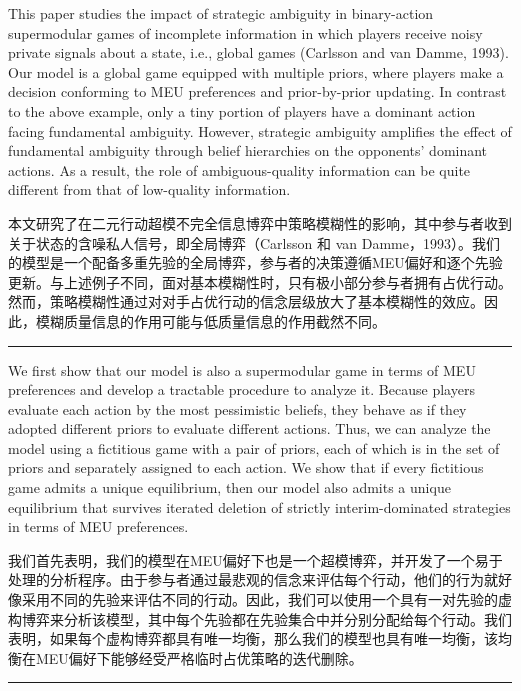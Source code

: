 \documentclass[12pt,a4paper]{article}
\newenvironment{original}
  {\par\medskip\noindent\color{black}\ignorespaces}
  {\par\medskip}
\newenvironment{translation}
  {\par\noindent\color{darkblue}\ignorespaces}
  {\par\medskip\noindent\hrule\par\medskip}
\theoremstyle{definition}
\theoremstyle{remark}
\begin{document}
\begin{original}
This paper studies the impact of strategic ambiguity in binary-action supermodular games of incomplete information in which players receive noisy private signals about a state, i.e., global games (Carlsson and van Damme, 1993). Our model is a global game equipped with multiple priors, where players make a decision conforming to MEU preferences and prior-by-prior updating. In contrast to the above example, only a tiny portion of players have a dominant action facing fundamental ambiguity. However, strategic ambiguity amplifies the effect of fundamental ambiguity through belief hierarchies on the opponents' dominant actions. As a result, the role of ambiguous-quality information can be quite different from that of low-quality information.
\end{original}
\begin{translation}
本文研究了在二元行动超模不完全信息博弈中策略模糊性的影响，其中参与者收到关于状态的含噪私人信号，即全局博弈（Carlsson 和 van Damme，1993）。我们的模型是一个配备多重先验的全局博弈，参与者的决策遵循MEU偏好和逐个先验更新。与上述例子不同，面对基本模糊性时，只有极小部分参与者拥有占优行动。然而，策略模糊性通过对对手占优行动的信念层级放大了基本模糊性的效应。因此，模糊质量信息的作用可能与低质量信息的作用截然不同。
\end{translation}

\begin{original}
We first show that our model is also a supermodular game in terms of MEU preferences and develop a tractable procedure to analyze it. Because players evaluate each action by the most pessimistic beliefs, they behave as if they adopted different priors to evaluate different actions. Thus, we can analyze the model using a fictitious game with a pair of priors, each of which is in the set of priors and separately assigned to each action. We show that if every fictitious game admits a unique equilibrium, then our model also admits a unique equilibrium that survives iterated deletion of strictly interim-dominated strategies in terms of MEU preferences.
\end{original}
\begin{translation}
我们首先表明，我们的模型在MEU偏好下也是一个超模博弈，并开发了一个易于处理的分析程序。由于参与者通过最悲观的信念来评估每个行动，他们的行为就好像采用不同的先验来评估不同的行动。因此，我们可以使用一个具有一对先验的虚构博弈来分析该模型，其中每个先验都在先验集合中并分别分配给每个行动。我们表明，如果每个虚构博弈都具有唯一均衡，那么我们的模型也具有唯一均衡，该均衡在MEU偏好下能够经受严格临时占优策略的迭代删除。
\end{translation}
\end{document}
